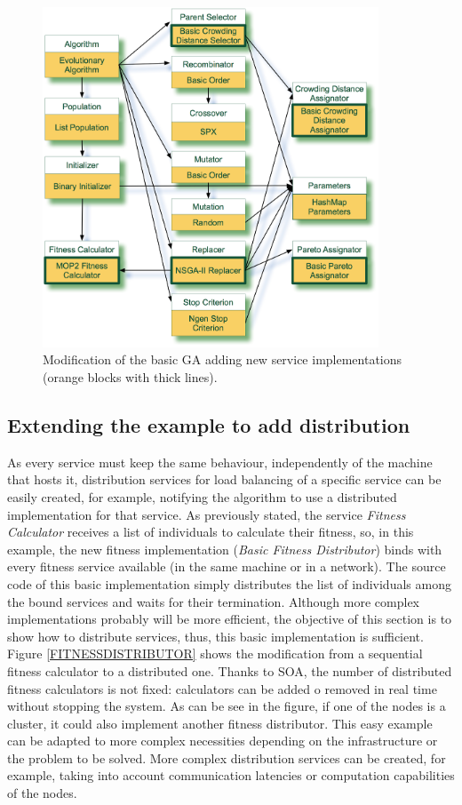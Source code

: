 \begin{figure}
\centering
\includegraphics[width=10cm]{gfx/soaea/nsga2.jpg}
\caption{Modification of the basic GA adding new service implementations (orange blocks with thick lines).}
\label{fig:nsga2}
\end{figure}



\subsection{Extending the example to add distribution}
\label{sec:distribution}

As every service must keep the same behaviour, independently of the machine that hosts it, distribution services for load balancing of a specific service can be easily created, for example, notifying the algorithm to use a distributed implementation for that service. As previously stated, the service {\em Fitness Calculator} receives a list of individuals to calculate their fitness, so, in this example, the new fitness implementation ({\em Basic Fitness Distributor}) binds with every fitness service available (in the same machine or in a network). The source code of this basic implementation simply distributes the list of individuals among the bound services and waits for their termination. Although more complex implementations probably will be more efficient, the objective of this section is to show how to distribute services, thus, this basic implementation is sufficient. Figure \ref{FITNESSDISTRIBUTOR} shows the modification from a sequential fitness calculator to a distributed one. Thanks to SOA, the number of distributed fitness calculators is not fixed: calculators can be added o removed in real time without stopping the system. As can be see in the figure, if one of the nodes is a cluster, it could also  implement another fitness distributor. This easy example can be adapted to more complex necessities depending on the infrastructure or the problem to be solved. More complex distribution services can be created, for example, taking into account communication latencies or computation capabilities of the nodes.




